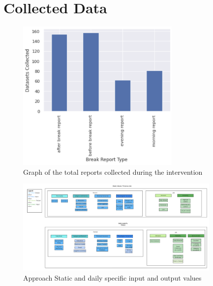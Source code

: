 \documentclass{hasel_thesis}
\begin{document}


\backmatter



\appendix
\chapter{Collected Data}

\begin{figure}[htp]
    \centering
    \includegraphics[width=8cm]{hasel_thesis/images/overall_reports_v2.png}
    \caption{Graph of the total reports collected during the intervention}
    \label{fig:overall_reports}
\end{figure}


\begin{figure}[htp]
    \centering
    \includegraphics[angle=90, width=10cm]{hasel_thesis/images/input_output_values.png}
    \caption{Approach Static and daily specific input and output values}
    \label{fig:approach_input_output}
\end{figure}
\end{document}
